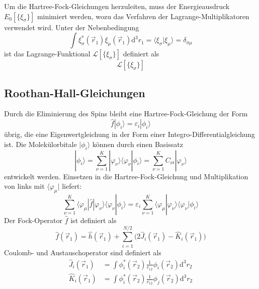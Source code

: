 \documentclass[9pt]{report}
\begin{document}
Um die Hartree-Fock-Gleichungen herzuleiten, muss der Energieausdruck $E_{0}[\{\xi_{\sigma}\}]$ minimiert werden, wozu das Verfahren der Lagrange-Multiplikatoren verwendet wird. Unter der Nebenbedingung
\begin{equation}
\int\xi_{\sigma}^{*}(\vec{r}_1)\xi_{\mu}(\vec{r}_1)\mathrm{d}^3r_1 = \big\langle\xi_{\sigma}\big|\xi_{\mu}\big\rangle = \delta_{\sigma\mu}
\end{equation}
ist das Lagrange-Funktional $\mathcal{L}[\{\xi_{\sigma}\}]$ definiert als
\begin{equation}
\mathcal{L}[\{\xi_{\sigma}\}]
\end{equation}




\subsection{Roothan-Hall-Gleichungen}
Durch die Eliminierung des Spins bleibt eine Hartree-Fock-Gleichung der Form
\begin{equation}
\hat{f}|\phi_i\rangle = \varepsilon_i|\phi_i\rangle
\end{equation}
übrig, die eine Eigenwertgleichung in der Form einer Integro-Differentialgleichung ist. Die Molekülorbitale $|\phi_i\rangle$ können durch einen Basissatz
\begin{equation}
|\phi_i\rangle = \sum_{\nu=1}^{K}|\varphi_{\nu}\rangle\langle\varphi_{\nu}|\phi_i\rangle = \sum_{\nu=1}^{K}C_{\nu i}|\varphi_{\nu}\rangle
\end{equation}
entwickelt werden. Einsetzen in die Hartree-Fock-Gleichung und Multiplikation von links mit $\langle\varphi_{\mu}|$ liefert:
\begin{equation}
\sum_{\nu=1}^{K}\langle\varphi_{\mu}|\hat{f}|\varphi_{\nu}\rangle\langle\varphi_{\nu}|\phi_i\rangle = \varepsilon_i\sum_{\nu=1}^{K}\langle\varphi_{\mu}|\varphi_{\nu}\rangle\langle\varphi_{\nu}|\phi_i\rangle
\end{equation}
Der Fock-Operator $\hat{f}$ ist definiert als
\begin{equation}
\hat{f}(\vec{r}_1)=\hat{h}(\vec{r}_1)+\sum_{i=1}^{N/2}\big(2\hat{J}_{i}(\vec{r}_1)-\hat{K}_i(\vec{r}_1)\big)
\end{equation}
Coulomb- und Austauschoperator sind definiert als
\begin{align}
\hat{J}_i(\vec{r}_1) &= \int\phi_i^{*}(\vec{r}_2)\frac{1}{r_{12}}\phi_i(\vec{r}_2)\mathrm{d}^3r_2\\
\hat{K}_i(\vec{r}_1) &= \int\phi_i^{*}(\vec{r}_2)\frac{1}{r_{12}}\phi_j(\vec{r}_2)\mathrm{d}^3r_2
\end{align}
\end{document}
